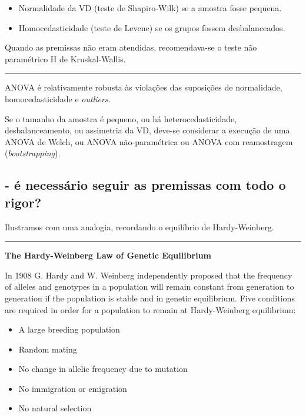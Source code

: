 \documentclass[]{article}
\providecommand{\tightlist}{%
  \setlength{\itemsep}{0pt}\setlength{\parskip}{0pt}}
\begin{document}
\begin{itemize}
\tightlist
\item
  Normalidade da VD (teste de Shapiro-Wilk) se a amostra fosse pequena.
\item
  Homocedasticidade (teste de Levene) se os grupos fossem
  desbalanceados.
\end{itemize}

Quando as premissas não eram atendidas, recomendava-se o teste não
paramétrico H de Kruskal-Wallis.

\begin{center}\rule{0.5\linewidth}{\linethickness}\end{center}

ANOVA é relativamente robusta às violações das suposições de
normalidade, homocedasticidade e \emph{outliers}.

Se o tamanho da amostra é pequeno, ou há heterocedasticidade,
desbalanceamento, ou assimetria da VD, deve-se considerar a execução de
uma ANOVA de Welch, ou ANOVA não-paramétrica ou ANOVA com reamostragem
(\emph{bootstrapping}).

\subsection{- é necessário seguir as premissas com todo o
rigor?}\label{e-necessario-seguir-as-premissas-com-todo-o-rigor}

Ilustramos com uma analogia, recordando o equilíbrio de Hardy-Weinberg.

\begin{center}\rule{0.5\linewidth}{\linethickness}\end{center}

\textbf{The Hardy-Weinberg Law of Genetic Equilibrium}

In 1908 G. Hardy and W. Weinberg independently proposed that the
frequency of alleles and genotypes in a population will remain constant
from generation to generation if the population is stable and in genetic
equilibrium. Five conditions are required in order for a population to
remain at Hardy-Weinberg equilibrium:

\begin{itemize}
\tightlist
\item
  A large breeding population
\item
  Random mating
\item
  No change in allelic frequency due to mutation
\item
  No immigration or emigration
\item
  No natural selection
\end{itemize}
\end{document}
